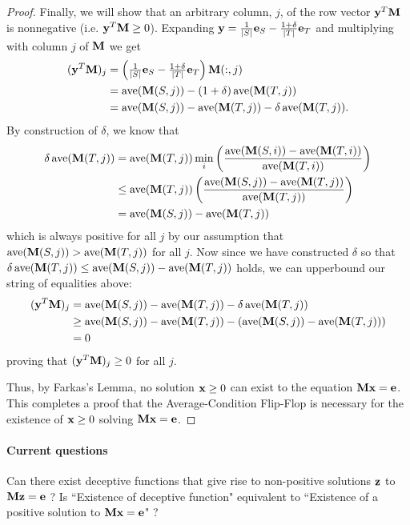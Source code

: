 \begin{proof}
  Finally, we will show that an arbitrary column, $j$, of the row vector $\textbf{y}^T\textbf{M}$ is nonnegative (i.e. $\textbf{y}^T\textbf{M} \geq 0$).
  Expanding $\textbf{y} = \tfrac{1}{|S|}\textbf{e}_S - \tfrac{1+\delta}{|T|}\textbf{e}_T$ and multiplying with column $j$ of $\textbf{M}$ we get
  \begin{align}
    (\textbf{y}^T\textbf{M})_j &= \left(\tfrac{1}{|S|}\textbf{e}_S - \tfrac{1+\delta}{|T|}\textbf{e}_T\right)\textbf{M}(:,j) \\
    &= \operatorname{ave}(\textbf{M}(S,j)) - (1+\delta)\operatorname{ave}(\textbf{M}(T,j)) \\
    &= \operatorname{ave}(\textbf{M}(S,j)) - \operatorname{ave}(\textbf{M}(T,j)) - \delta \operatorname{ave}(\textbf{M}(T,j)).
  \end{align}
  By construction of $\delta$, we know that
  \begin{align}
    \delta \operatorname{ave}(\textbf{M}(T,j)) &=  \operatorname{ave}(\textbf{M}(T,j))  \displaystyle\min_i \left(  \frac{\operatorname{ave}(\textbf{M}(S,i)) - \operatorname{ave}(\textbf{M}(T,i))}{\operatorname{ave}(\textbf{M}(T,i))}   \right) \\
    &\leq \operatorname{ave}(\textbf{M}(T,j))  \left(  \frac{\operatorname{ave}(\textbf{M}(S,j)) - \operatorname{ave}(\textbf{M}(T,j))}{\operatorname{ave}(\textbf{M}(T,j))}   \right) \\
    &=  \operatorname{ave}(\textbf{M}(S,j)) - \operatorname{ave}(\textbf{M}(T,j))
  \end{align}
  which is always positive for all $j$ by our assumption that $\operatorname{ave}(\textbf{M}(S,j)) > \operatorname{ave}(\textbf{M}(T,j))$ for all $j$. Now since we have constructed $\delta$ so that
  $\delta \operatorname{ave}(\textbf{M}(T,j)) \leq   \operatorname{ave}(\textbf{M}(S,j)) - \operatorname{ave}(\textbf{M}(T,j))$ holds,
we can upperbound our string of equalities above:
\begin{align}
    (\textbf{y}^T\textbf{M})_j &= \operatorname{ave}(\textbf{M}(S,j)) - \operatorname{ave}(\textbf{M}(T,j)) - \delta \operatorname{ave}(\textbf{M}(T,j)) \\
    & \geq \operatorname{ave}(\textbf{M}(S,j)) - \operatorname{ave}(\textbf{M}(T,j)) - ( \operatorname{ave}(\textbf{M}(S,j)) - \operatorname{ave}(\textbf{M}(T,j))  ) \\
    &= 0
\end{align}
proving that $(\textbf{y}^T\textbf{M})_j \geq 0 $ for all $j$.

Thus, by Farkas's Lemma, no solution $\textbf{x} \geq 0 $ can exist to the equation $\textbf{M}\textbf{x} = \textbf{e}$.
This completes a proof that the Average-Condition Flip-Flop is necessary for the existence of $\textbf{x} \geq 0 $ solving $\textbf{M}\textbf{x} = \textbf{e}$.

\end{proof}


\paragraph{Current questions}
Can there exist deceptive functions that give rise to non-positive solutions $\textbf{z}$ to $\textbf{M}\textbf{z} = \textbf{e}$ ?
Is ``Existence of deceptive function" equivalent to ``Existence of a positive solution to $\textbf{M}\textbf{x} = \textbf{e}$" ?

